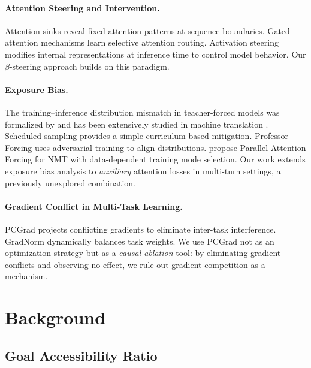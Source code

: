 \documentclass[11pt]{article}
\begin{document}
\paragraph{Attention Steering and Intervention.}
Attention sinks \citep{xiao2024efficient} reveal fixed attention patterns at sequence boundaries. Gated attention mechanisms \citep{qiu2025gated} learn selective attention routing. Activation steering \citep{turner2023activation,li2024inference} modifies internal representations at inference time to control model behavior. Our $\beta$-steering approach builds on this paradigm.

\paragraph{Exposure Bias.}
The training--inference distribution mismatch in teacher-forced models was formalized by \citet{ranzato2016sequence} and has been extensively studied in machine translation \citep{wiseman2016sequence,zhang2019bridging}. Scheduled sampling \citep{bengio2015scheduled} provides a simple curriculum-based mitigation. Professor Forcing \citep{lamb2016professor} uses adversarial training to align distributions. \citet{dou2022parallel} propose Parallel Attention Forcing for NMT with data-dependent training mode selection. Our work extends exposure bias analysis to \emph{auxiliary} attention losses in multi-turn settings, a previously unexplored combination.

\paragraph{Gradient Conflict in Multi-Task Learning.}
PCGrad \citep{yu2020gradient} projects conflicting gradients to eliminate inter-task interference. GradNorm \citep{chen2018gradnorm} dynamically balances task weights. We use PCGrad not as an optimization strategy but as a \emph{causal ablation} tool: by eliminating gradient conflicts and observing no effect, we rule out gradient competition as a mechanism.

\section{Background}

\subsection{Goal Accessibility Ratio}
\end{document}
